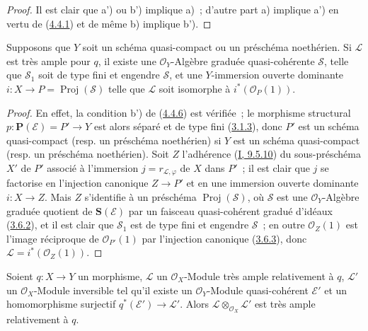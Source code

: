 \begin{proof}
Il est clair que a') ou b') implique a)~; d'autre part a) implique a') en
vertu de (\hyperref[II.4.4.1-fr]{4.4.1}) et de même b) implique b').
\end{proof}

\begin{corollary}[4.4.7]
\label{II.4.4.7-fr}
Supposons que $Y$ soit un schéma quasi-compact ou un préschéma noethérien. Si
$\mathcal{L}$ est très ample pour $q$, il existe une $\mathcal{O}_Y$-Algèbre
graduée quasi-cohérente $\mathcal{S}$, telle que $\mathcal{S}_1$ soit de type
fini et engendre $\mathcal{S}$, et une $Y$-immersion ouverte dominante
$i:X\to P=\operatorname{Proj}(\mathcal{S})$ telle que $\mathcal{L}$ soit
isomorphe à $i^*(\mathcal{O}_P(1))$.
\end{corollary}

\begin{proof}
En effet, la condition b') de (\hyperref[II.4.4.6-fr]{4.4.6}) est vérifiée~;
le morphisme structural $p:\mathbf{P}(\mathcal{E})=P'\to Y$ est alors séparé
et de type fini (\hyperref[II.3.1.3-fr]{3.1.3}), donc $P'$ est un schéma
quasi-compact (resp. un préschéma noethérien) si $Y$ est un schéma
quasi-compact (resp. un préschéma noethérien). Soit $Z$ l'adhérence
(\hyperref[I.9.5.10-fr]{I, 9.5.10}) du sous-préschéma $X'$ de $P'$ associé à
l'immersion $j=r_{\mathcal{L},\varphi}$ de $X$ dans $P'$~; il est clair que
$j$ se factorise en l'injection canonique $Z\to P'$ et en une immersion
ouverte dominante $i:X\to Z$. Mais $Z$ s'identifie à un préschéma
$\operatorname{Proj}(\mathcal{S})$, où $\mathcal{S}$ est une
$\mathcal{O}_Y$-Algèbre graduée quotient de $\mathbf{S}(\mathcal{E})$ par un
faisceau quasi-cohérent gradué d'idéaux
(\hyperref[II.3.6.2-fr]{3.6.2}), et il est clair que $\mathcal{S}_1$ est de
type fini et engendre $\mathcal{S}$~; en outre $\mathcal{O}_Z(1)$ est l'image
réciproque de $\mathcal{O}_{P'}(1)$ par l'injection canonique
(\hyperref[II.3.6.3-fr]{3.6.3}), donc
$\mathcal{L}=i^*(\mathcal{O}_Z(1))$.
\end{proof}

\begin{proposition}[4.4.8]
\label{II.4.4.8-fr}
Soient $q:X\to Y$ un morphisme, $\mathcal{L}$ un $\mathcal{O}_X$-Module très
ample relativement à $q$, $\mathcal{L}'$ un $\mathcal{O}_X$-Module inversible
tel qu'il existe un $\mathcal{O}_Y$-Module quasi-cohérent $\mathcal{E}'$ et un
homomorphisme surjectif $q^*(\mathcal{E}')\to\mathcal{L}'$. Alors
$\mathcal{L}\otimes_{\mathcal{O}_X}\mathcal{L}'$ est très ample relativement
à $q$.
\end{proposition}

